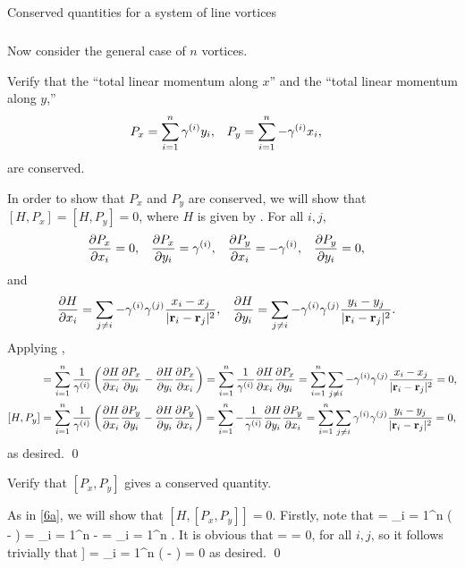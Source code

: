 \newcommand{\Px}{P_x}
\newcommand{\Py}{P_y}

\begin{statement}{Conserved quantities for a system of line vortices} \label{vort2}
\subparagraph{}
	Now consider the general case of $n$ vortices.
\end{statement}

\begin{problem} \label{6a}
	Verify that the ``total linear momentum along $x$'' and the ``total linear momentum along $y$,''
	\begin{align*}
		\Px &= \sum_{i = 1}^n \gami \yi, &
		\Py &= \sum_{i = 1}^n -\gami \xi,
	\end{align*}
	are conserved.
\end{problem}

\begin{solution}
	In order to show that $\Px$ and $\Py$ are conserved, we will show that $[H, \Px] = [H, \Py] = 0$, where $H$ is given by .  For all $i, j$,
	\begin{align*}
		\pdv{\Px}{\xi} &= 0, &
		\pdv{\Px}{\yi} &= \gami, &
		\pdv{\Py}{\xi} &= -\gami, &
		\pdv{\Py}{\yi} &= 0,
	\end{align*}
	and
	\begin{align*}
		\pdv{H}{x_i} &= \sum_{j \neq i} - \gamma^{(i)} \gamma^{(j)} \frac{x_i - x_j}{|\mathbf{r}_i - \mathbf{r}_j|^2}, &
		\pdv{H}{y_i} &= \sum_{j \neq i} - \gamma^{(i)} \gamma^{(j)} \frac{y_i - y_j}{|\mathbf{r}_i - \mathbf{r}_j|^2}.
	\end{align*}
	Applying ,
	\begin{align*}
		[H, \Px] &= \sum_{i = 1}^n \frac{1}{\gami} \left( \pdv{H}{\xi} \pdv{\Px}{\yi} - \pdv{H}{\yi} \pdv{\Px}{\xi} \right)
		= \sum_{i = 1}^n \frac{1}{\gami} \pdv{H}{\xi} \pdv{\Px}{\yi}
		= \sum_{i = 1}^n \sum_{j \neq i} -\gami \gamj \frac{\xi - \xj}{|\vri - \vrj|^2}
		= 0, \\
		[H, \Py] &= \sum_{i = 1}^n \frac{1}{\gami} \left( \pdv{H}{\xi} \pdv{\Py}{\yi} - \pdv{H}{\yi} \pdv{\Py}{\xi} \right)
		= \sum_{i = 1}^n -\frac{1}{\gami} \pdv{H}{\yi} \pdv{\Py}{\xi}
		= \sum_{i = 1}^n \sum_{j \neq i} \gami \gamj \frac{\yi - \yj}{|\vri - \vrj|^2}
		= 0,
	\end{align*}
	as desired. \qed
\end{solution}

\begin{problem}
	Verify that $[\Px, \Py]$ gives a conserved quantity.
\end{problem}

\begin{solution}
	As in \ref{6a}, we will show that $[H, [\Px, \Py]] = 0$.  Firstly, note that
	\beq
		[\Px, \Py] = \sum_{i = 1}^n  \left( \pdv{\Px}{\xi} \pdv{\Py}{\yi} - \pdv{\Px}{\yi} \pdv{\Py}{\xi} \right)
		= \sum_{i = 1}^n - \pdv{\Px}{\yi} \pdv{\Py}{\xi}
		= \sum_{i = 1}^n \gami.
	\eeq
	It is obvious that
	\beq
		\pdv{[\Px, \Py]}{\xi} = \pdv{[\Px, \Py]}{\yi} = 0,
	\eeq
	for all $i, j$, so it follows trivially that
	\beq
		[H, [\Px, \Py]] = \sum_{i = 1}^n  \left(  \pdv{[\Px, \Py]}{\yi} -  \pdv{[\Px, \Py]}{\xi} \right) = 0
	\eeq
	as desired. \qed
\end{solution}